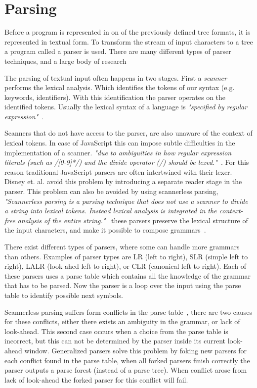 \section{Parsing} \label{parsing}
Before a program is represented in on of the previously defined tree formats, it is represented in textual form. To transform the stream of input characters to a tree a program called a parser is used. There are many different types of parser techniques, and a large body of research~\cite{Visser1997,VandenBrand2002,Salomon1989}

The parsing of textual input often happens in two stages. First a \textit{scanner} performs the lexical analysis. Which identifies the tokens of our syntax (e.g. keywords, identifiers). With this identification the parser operates on the identified tokens. Usually the lexical syntax of a language is \textit{"specified by regular expression"}~\cite{Bravenboer2004}.

Scanners that do not have access to the parser, are also unaware of the context of lexical tokens. In case of JavaScript this can impose subtle difficulties in the implementation of a scanner. \textit{"due to ambiguities in how regular expression literals (such as /[0-9]*/) and the divide operator (/) should be lexed."}~\cite{Disney2014}. For this reason traditional JavaScript parsers are often intertwined with their lexer. Disney et. al. avoid this problem by introducing a separate reader stage in the parser. This problem can also be avoided by using scannerless parsing, \textit{"Scannerless parsing is a parsing technique that does not use a scanner to divide a string into lexical tokens. Instead lexical analysis is integrated in the context-free analysis of the entire string."}~\cite{Visser1997} these parsers preserve the lexical structure of the input characters, and make it possible to compose grammars~\cite{Visser1997}.

There exist different types of parsers, where some can handle more grammars than others. Examples of parser types are LR (left to right), SLR (simple left to right), LALR (look-ahed left to right), or CLR (canonical left to right). Each of these parsers uses a parse table which contains all the knowledge of the grammar that has to be parsed. Now the parser is a loop over the input using the parse table to identify possible next symbols.

Scannerless parsing suffers form conflicts in the parse table~\cite{Visser1997}, there are two causes for these conflicts, either there exists an ambiguity in the grammar, or lack of look-ahead. This second case occurs when a choice from the parse table is incorrect, but this can not be determined by the parser inside its current look-ahead window. Generalized parsers solve this problem by foking new parsers for each conflict found in the parse table, when all forked parsers finish correctly the parser outputs a parse forest (instead of a parse tree). When conflict arose from lack of look-ahead the forked parser for this conflict will fail.

